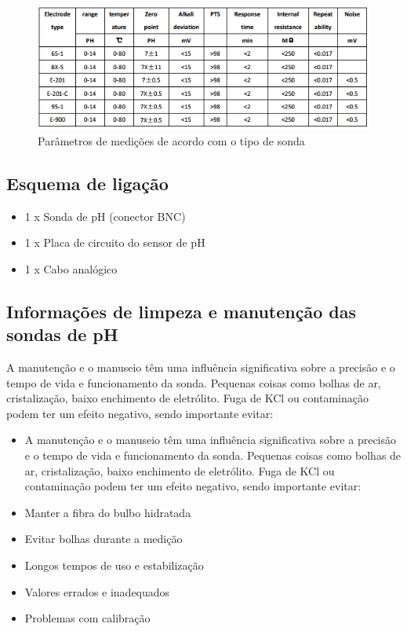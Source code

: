 \begin{figure}[H]
	\centering
	\includegraphics[width=15cm]{figuras/parametros_medicoes.png}
	\caption{Parâmetros de medições de acordo com o tipo de sonda}
	\label{parametros_medicoes}
\end{figure}

\subsection{Esquema de ligação}

\begin{itemize}
	\item 1 x Sonda de pH (conector BNC)
	\item 1 x Placa de circuito do sensor de pH
	\item 1 x Cabo analógico
\end{itemize}

\subsection{Informações de limpeza e manutenção das sondas de pH}

A manutenção e o manuseio têm uma influência significativa sobre a precisão e o tempo de vida
e funcionamento da sonda. Pequenas coisas como bolhas de ar, cristalização, baixo enchimento de
eletrólito. Fuga de KCl ou contaminação podem ter um efeito negativo, sendo importante evitar:

\begin{itemize}
	\item A manutenção e o manuseio têm uma influência significativa sobre a precisão e o tempo de vida
	e funcionamento da sonda. Pequenas coisas como bolhas de ar, cristalização, baixo enchimento de
	eletrólito. Fuga de KCl ou contaminação podem ter um efeito negativo, sendo importante evitar:
	\item Manter a fibra do bulbo hidratada
	\item Evitar bolhas durante a medição
	\item Longos tempos de uso e estabilização
	\item Valores errados e inadequados
	\item Problemas com calibração
\end{itemize}

